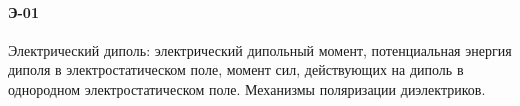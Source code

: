 \documentclass[__main__.tex]{subfiles}
\begin{document}
\paragraph{Э-01} 
Электрический диполь: электрический дипольный момент, потенциальная энергия диполя в электростатическом поле, момент сил, действующих на диполь в однородном электростатическом поле. Механизмы поляризации диэлектриков.
\end{document}
